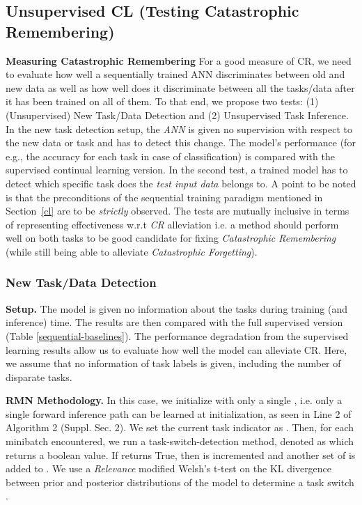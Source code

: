 \documentclass{article}
\begin{document}
\subsection{Unsupervised CL (Testing Catastrophic Remembering)}\label{cr-ex}

\textbf{Measuring Catastrophic Remembering}
For a good measure of CR, we need to evaluate how well a sequentially trained ANN discriminates between old and new data as well as how well does it discriminate between all the tasks/data after it has been trained on all of them.
To that end, we propose two tests: (1) (Unsupervised) New Task/Data Detection and (2) Unsupervised Task Inference.
In the new task detection setup, the \textit{ANN} is given no supervision with respect to the new data or task and has to detect this change. The model's performance (for e.g., the accuracy for each task in case of classification) is compared with the supervised continual learning version. In the second test, a trained model has to detect which specific task does the \textit{test input data} belongs to. A point to be noted is that the preconditions of the sequential training paradigm mentioned in Section~\ref{cl} are to be \textit{strictly} observed. The tests are mutually inclusive in terms of representing effectiveness w.r.t \textit{CR} alleviation i.e. a method should perform well on both tasks to be good candidate for fixing \textit{Catastrophic Remembering} (while still being able to alleviate \textit{Catastrophic Forgetting}).

\subsubsection{New Task/Data Detection}

\textbf{Setup.} The model is given no information about the tasks during training (and inference) time. The results are then compared with the full supervised version (Table \ref{sequential-baselines}). The performance degradation from the supervised learning results allow us to evaluate how well the model can alleviate CR. Here, we assume that no information of task labels is given, including the number of disparate tasks. 

\textbf{RMN Methodology.} In this case, we initialize  with only a single , i.e. only a single forward inference path can be learned
at initialization, as seen in Line 2 of Algorithm 2 (Suppl. Sec. 2). We set the current task indicator as . Then, for each minibatch  encountered, we run a task-switch-detection  method, denoted as  which returns a boolean value. If  returns True, then  is incremented and another set of  is added to . 
We use a \textit{Relevance} modified Welsh’s t-test on the KL divergence between prior and posterior distributions of the model to determine a task switch \cite{titsias2019functional, hendrycks2016baseline, lee2018simple}.
\end{document}
